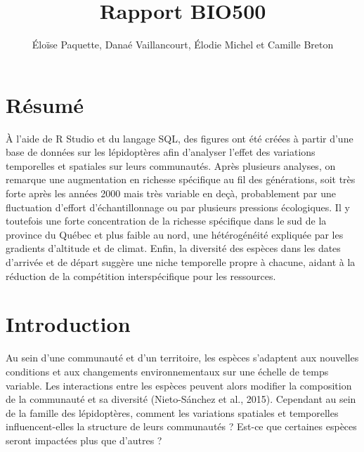 \documentclass[9pt,twocolumn,twoside,]{pnas-new}
\title{Rapport BIO500}
\author[]{Éloïse Paquette, Danaé Vaillancourt, Élodie Michel et Camille
Breton}
\begin{document}
\verticaladjustment{-2pt}



\maketitle
\thispagestyle{firststyle}


\acknow{}

\section*{Résumé}\label{ruxe9sumuxe9}

À l'aide de R Studio et du langage SQL, des figures ont été créées à
partir d'une base de données sur les lépidoptères afin d'analyser
l'effet des variations temporelles et spatiales sur leurs communautés.
Après plusieurs analyses, on remarque une augmentation en richesse
spécifique au fil des générations, soit très forte après les années 2000
mais très variable en deçà, probablement par une fluctuation d'effort
d'échantillonnage ou par plusieurs pressions écologiques. Il y toutefois
une forte concentration de la richesse spécifique dans le sud de la
province du Québec et plus faible au nord, une hétérogénéité expliquée
par les gradients d'altitude et de climat. Enfin, la diversité des
espèces dans les dates d'arrivée et de départ suggère une niche
temporelle propre à chacune, aidant à la réduction de la compétition
interspécifique pour les ressources.

\section*{Introduction}\label{introduction}

Au sein d'une communauté et d'un territoire, les espèces s'adaptent aux
nouvelles conditions et aux changements environnementaux sur une échelle
de temps variable. Les interactions entre les espèces peuvent alors
modifier la composition de la communauté et sa diversité (Nieto-Sánchez
et al., 2015). Cependant au sein de la famille des lépidoptères, comment
les variations spatiales et temporelles influencent-elles la structure
de leurs communautés ? Est-ce que certaines espèces seront impactées
plus que d'autres ?
\end{document}
